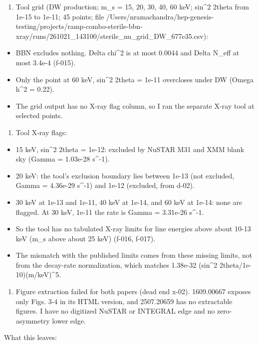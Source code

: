 \documentclass[11pt,a4paper]{article}
\begin{document}
\begin{enumerate}
  \item Tool grid (DW production; m\_s = 15, 20, 30, 40, 60 keV; sin\textasciicircum{}2 2theta from 1e-15 to 1e-11; 45 points; file /Users/nramachandra/hep-genesis-testing/projects/ramp-combo-sterile-bbn-xray/runs/261021\_143100/sterile\_nu\_grid\_DW\_677e35.csv):
\end{enumerate}
\begin{itemize}
  \item BBN excludes nothing. \textbar{}Delta chi\textasciicircum{}2\textbar{} is at most 0.0044 and Delta N\_eff at most 3.4e-4 (f-015).
  \item Only the point at 60 keV, sin\textasciicircum{}2 2theta = 1e-11 overcloses under DW (Omega h\textasciicircum{}2 = 0.22).
  \item The grid output has no X-ray flag column, so I ran the separate X-ray tool at selected points.
\end{itemize}
\begin{enumerate}
  \item Tool X-ray flags:
\end{enumerate}
\begin{itemize}
  \item 15 keV, sin\textasciicircum{}2 2theta = 1e-12: excluded by NuSTAR M31 and XMM blank sky (Gamma = 1.03e-28 s\textasciicircum{}-1).
  \item 20 keV: the tool's exclusion boundary lies between 1e-13 (not excluded, Gamma = 4.36e-29 s\textasciicircum{}-1) and 1e-12 (excluded, from d-02).
  \item 30 keV at 1e-13 and 1e-11, 40 keV at 1e-14, and 60 keV at 1e-14: none are flagged. At 30 keV, 1e-11 the rate is Gamma = 3.31e-26 s\textasciicircum{}-1.
  \item So the tool has no tabulated X-ray limits for line energies above about 10-13 keV (m\_s above about 25 keV) (f-016, f-017).
  \item The mismatch with the published limits comes from these missing limits, not from the decay-rate normalization, which matches 1.38e-32 (sin\textasciicircum{}2 2theta/1e-10)(m/keV)\textasciicircum{}5.
\end{itemize}
\begin{enumerate}
  \item Figure extraction failed for both papers (dead end x-02). 1609.00667 exposes only Figs. 3-4 in its HTML version, and 2507.20659 has no extractable figures. I have no digitized NuSTAR or INTEGRAL edge and no zero-asymmetry lower edge.
\end{enumerate}
What this leaves:
\end{document}
